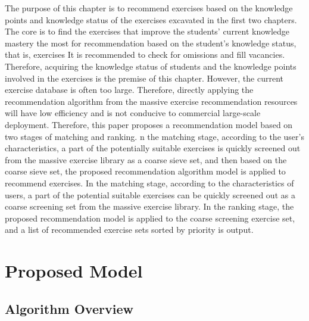 The purpose of this chapter is to recommend exercises based on the knowledge points and knowledge status of the exercises excavated in the first two chapters. The core is to find the exercises that improve the students' current knowledge mastery the most for recommendation based on the student's knowledge status, that is, exercises It is recommended to check for omissions and fill vacancies. Therefore, acquiring the knowledge status of students and the knowledge points involved in the exercises is the premise of this chapter. However, the current exercise database is often too large. Therefore, directly applying the recommendation algorithm from the massive exercise recommendation resources will have low efficiency and is not conducive to commercial large-scale deployment. Therefore, this paper proposes a recommendation model based on two stages of matching and ranking. n the matching stage, according to the user's characteristics, a part of the potentially suitable exercises is quickly screened out from the massive exercise library as a coarse sieve set, and then based on the coarse sieve set, the proposed recommendation algorithm model is applied to recommend exercises. In the matching stage, according to the characteristics of users, a part of the potential suitable exercises can be quickly screened out as a coarse screening set from the massive exercise library. In the ranking stage, the proposed recommendation model is applied to the coarse screening exercise set, and a list of recommended exercise sets sorted by priority is output.

\section{Proposed Model}
\subsection{Algorithm Overview}

